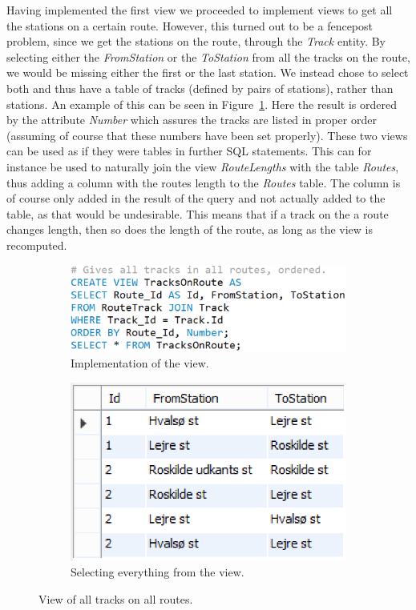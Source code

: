 Having implemented the first view we proceeded to implement views to get all 
the stations on a certain route. However, this turned out to be a fencepost 
problem, since we get the stations on the route, through the \emph{Track} 
entity. By selecting either the \emph{FromStation} or the \emph{ToStation} from 
all the tracks on the route, we would be missing either the first or the last 
station. We instead chose to select both and thus have a table of tracks 
(defined by pairs of stations), rather than stations. An example of this can be 
seen in Figure~\ref{fig:route}. Here the result is ordered by the attribute 
\emph{Number} which assures the tracks are listed in proper order (assuming of 
course that these numbers have been set properly). These two views can be used 
as if they were tables in further SQL statements. This can for instance be used 
to naturally join the view \emph{RouteLengths} with the table \emph{Routes}, 
thus adding a column with the routes length to the \emph{Routes} table. The 
column is of course only added in the result of the query and not actually 
added to the table, as that would be undesirable. This means that if a track on 
the a route changes length, then so does the length of the route, as long as 
the view is recomputed.

\begin{figure}[h]
    \centering
    \begin{subfigure}[b]{0.45 \textwidth}
        \centering
        \includegraphics[width=\textwidth]{img/TracksOnRoute}
        \caption{Implementation of the view.}
    \end{subfigure}
    \begin{subfigure}[b]{0.45 \textwidth}
        \centering
        \includegraphics{img/RouteView}
        \caption{Selecting everything from the view.}
    \end{subfigure}
    \caption{View of all tracks on all routes.}
    \label{fig:route}
\end{figure}


